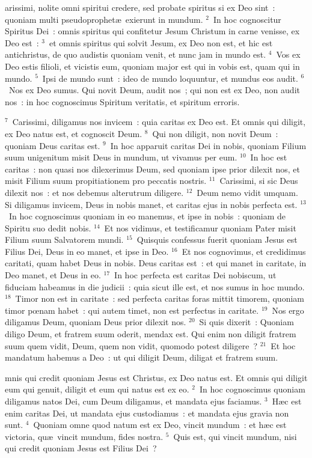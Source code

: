 \bchapter
{}arissimi, nolite omni spiritui credere, sed probate spiritus si ex Deo sint~: quoniam multi pseudoprophet\ae\ exierunt in mundum.
${}^{2}$~In hoc cognoscitur Spiritus Dei~: omnis spiritus qui confitetur Jesum Christum in carne venisse, ex Deo est~:
${}^{3}$~et omnis spiritus qui solvit Jesum, ex Deo non est, et hic est antichristus, de quo audistis quoniam venit, et nunc jam in mundo est.
${}^{4}$~Vos ex Deo estis filioli, et vicistis eum, quoniam major est qui in vobis est, quam qui in mundo.
${}^{5}$~Ipsi de mundo sunt~: ideo de mundo loquuntur, et mundus eos audit.
${}^{6}$~Nos ex Deo sumus. Qui novit Deum, audit nos~; qui non est ex Deo, non audit nos~: in hoc cognoscimus Spiritum veritatis, et spiritum erroris.


${}^{7}$~Carissimi, diligamus nos invicem~: quia caritas ex Deo est. Et omnis qui diligit, ex Deo natus est, et cognoscit Deum.
${}^{8}$~Qui non diligit, non novit Deum~: quoniam Deus caritas est.
${}^{9}$~In hoc apparuit caritas Dei in nobis, quoniam Filium suum unigenitum misit Deus in mundum, ut vivamus per eum.
${}^{10}$~In hoc est caritas~: non quasi nos dilexerimus Deum, sed quoniam ipse prior dilexit nos, et misit Filium suum propitiationem pro peccatis nostris.
${}^{11}$~Carissimi, si sic Deus dilexit nos~: et nos debemus alterutrum diligere.
${}^{12}$~Deum nemo vidit umquam. Si diligamus invicem, Deus in nobis manet, et caritas ejus in nobis perfecta est.
${}^{13}$~In hoc cognoscimus quoniam in eo manemus, et ipse in nobis~: quoniam de Spiritu suo dedit nobis.
${}^{14}$~Et nos vidimus, et testificamur quoniam Pater misit Filium suum Salvatorem mundi.
${}^{15}$~Quisquis confessus fuerit quoniam Jesus est Filius Dei, Deus in eo manet, et ipse in Deo.
${}^{16}$~Et nos cognovimus, et credidimus caritati, quam habet Deus in nobis. Deus caritas est~: et qui manet in caritate, in Deo manet, et Deus in eo.
${}^{17}$~In hoc perfecta est caritas Dei nobiscum, ut fiduciam habeamus in die judicii~: quia sicut ille est, et nos sumus in hoc mundo.
${}^{18}$~Timor non est in caritate~: sed perfecta caritas foras mittit timorem, quoniam timor pœnam habet~: qui autem timet, non est perfectus in caritate.
${}^{19}$~Nos ergo diligamus Deum, quoniam Deus prior dilexit nos.
${}^{20}$~Si quis dixerit~: Quoniam diligo Deum, et fratrem suum oderit, mendax est. Qui enim non diligit fratrem suum quem vidit, Deum, quem non vidit, quomodo potest diligere~?
${}^{21}$~Et hoc mandatum habemus a Deo~: ut qui diligit Deum, diligat et fratrem suum.

\bchapter
{}mnis qui credit quoniam Jesus est Christus, ex Deo natus est. Et omnis qui diligit eum qui genuit, diligit et eum qui natus est ex eo.
${}^{2}$~In hoc cognoscimus quoniam diligamus natos Dei, cum Deum diligamus, et mandata ejus faciamus.
${}^{3}$~H\ae c est enim caritas Dei, ut mandata ejus custodiamus~: et mandata ejus gravia non sunt.
${}^{4}$~Quoniam omne quod natum est ex Deo, vincit mundum~: et h\ae c est victoria, qu\ae\ vincit mundum, fides nostra.
${}^{5}$~Quis est, qui vincit mundum, nisi qui credit quoniam Jesus est Filius Dei~?


